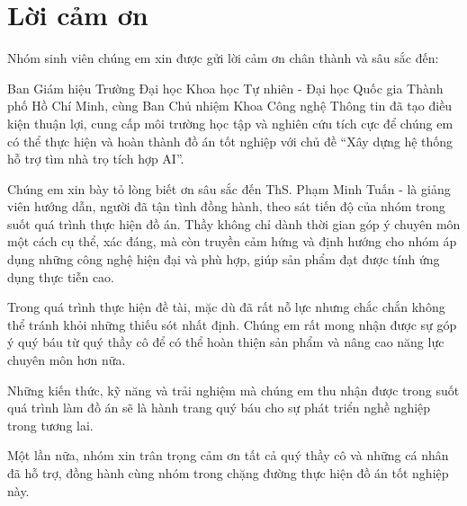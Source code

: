 \chapter*{Lời cảm ơn}
\label{thanks}

Nhóm sinh viên chúng em xin được gửi lời cảm ơn chân thành và sâu
sắc đến:

Ban Giám hiệu Trường Đại học Khoa học Tự nhiên - Đại học Quốc gia
Thành phố Hồ Chí Minh, cùng Ban Chủ nhiệm Khoa Công nghệ Thông
tin đã tạo điều kiện thuận lợi, cung cấp môi trường học tập và nghiên cứu tích cực để chúng em có thể thực hiện và hoàn thành đồ án tốt nghiệp với chủ đề “Xây dựng hệ thống hỗ trợ tìm nhà trọ tích hợp AI”.

Chúng em xin bày tỏ lòng biết ơn sâu sắc đến ThS. Phạm Minh Tuấn - là giảng viên hướng dẫn, người đã tận tình đồng hành, theo sát tiến độ của nhóm trong suốt quá trình thực hiện đồ án. Thầy không chỉ dành thời gian góp ý chuyên môn một cách cụ thể, xác đáng, mà còn truyền cảm hứng và định hướng cho nhóm áp dụng những công nghệ hiện đại và phù hợp, giúp sản phẩm đạt được tính ứng dụng thực tiễn cao.

Trong quá trình thực hiện đề tài, mặc dù đã rất nỗ lực nhưng chắc chắn không thể tránh khỏi những thiếu sót nhất định. Chúng em rất mong nhận được sự góp ý quý báu từ quý thầy cô để có thể hoàn thiện sản phẩm và nâng cao năng lực chuyên môn hơn nữa.

Những kiến thức, kỹ năng và trải nghiệm mà chúng em thu nhận được trong suốt quá trình làm đồ án sẽ là hành trang quý báu cho sự phát triển nghề nghiệp trong tương lai.

Một lần nữa, nhóm xin trân trọng cảm ơn tất cả quý thầy cô và những cá nhân đã hỗ trợ, đồng hành cùng nhóm trong chặng đường thực hiện đồ án tốt nghiệp này.
